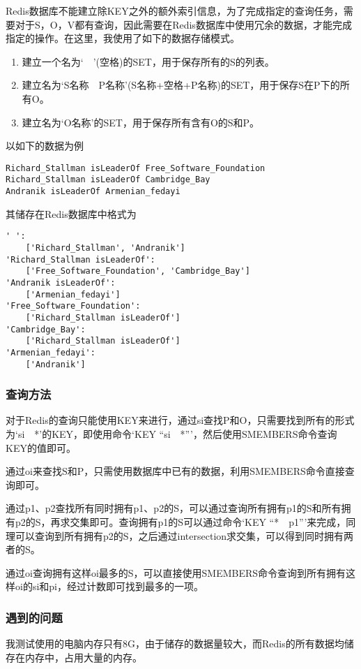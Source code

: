 \documentclass[12pt]{ctexart}
\begin{document}
Redis数据库不能建立除KEY之外的额外索引信息，为了完成指定的查询任务，需要对于S，O，V都有查询，因此需要在Redis数据库中使用冗余的数据，才能完成指定的操作。在这里，我使用了如下的数据存储模式。
\begin{enumerate}
    \itemsep0em
    \item 建立一个名为`~~'(空格)的SET，用于保存所有的S的列表。
    \item 建立名为`S名称~~P名称'(S名称+空格+P名称)的SET，用于保存S在P下的所有O。
    \item 建立名为`O名称'的SET，用于保存所有含有O的S和P。
\end{enumerate}
以如下的数据为例
\begin{verbatim}
Richard_Stallman isLeaderOf Free_Software_Foundation
Richard_Stallman isLeaderOf Cambridge_Bay
Andranik isLeaderOf Armenian_fedayi
\end{verbatim}
其储存在Redis数据库中格式为
\begin{verbatim}
' ':
    ['Richard_Stallman', 'Andranik']
'Richard_Stallman isLeaderOf': 
    ['Free_Software_Foundation', 'Cambridge_Bay']
'Andranik isLeaderOf':
    ['Armenian_fedayi']
'Free_Software_Foundation':
    ['Richard_Stallman isLeaderOf']
'Cambridge_Bay':
    ['Richard_Stallman isLeaderOf']
'Armenian_fedayi':
    ['Andranik']
\end{verbatim}

\subsubsection{查询方法}

对于Redis的查询只能使用KEY来进行，通过si查找P和O，只需要找到所有的形式为`si~~*'的KEY，即使用命令`KEY ``si~~*'''，然后使用SMEMBERS命令查询KEY的值即可。

通过oi来查找S和P，只需使用数据库中已有的数据，利用SMEMBERS命令直接查询即可。

通过p1、p2查找所有同时拥有p1、p2的S，可以通过查询所有拥有p1的S和所有拥有p2的S，再求交集即可。查询拥有p1的S可以通过命令`KEY ``*~~p1'''来完成，同理可以查询到所有拥有p2的S，之后通过intersection求交集，可以得到同时拥有两者的S。

通过oi查询拥有这样oi最多的S，可以直接使用SMEMBERS命令查询到所有拥有这样oi的si和pi，经过计数即可找到最多的一项。

\subsubsection{遇到的问题}

我测试使用的电脑内存只有8G，由于储存的数据量较大，而Redis的所有数据均储存在内存中，占用大量的内存。
\end{document}
